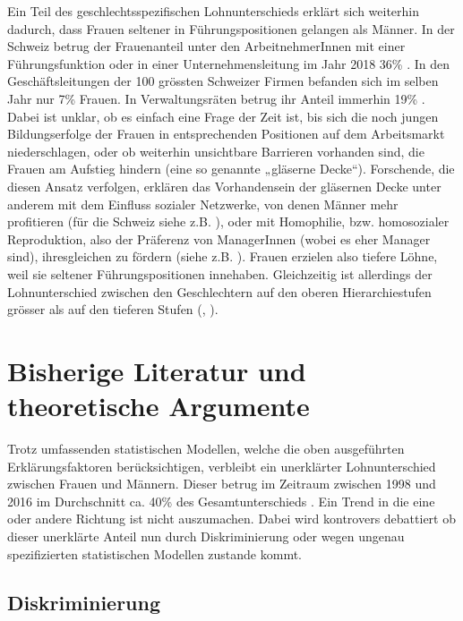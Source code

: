 \documentclass[a4paper,12pt]{article}
\renewcommand{\baselinestretch}{1.1}
\newif\ifcomments
\newcommand{\comment}[1]{%
    \ifcomments\marginpar{\renewcommand{\baselinestretch}{1}\tiny\hspace*{-1.1em}\colorbox{gray!20}%
    {\textcolor{red}{\parbox[t]{.9in}{\raggedright #1}}}}\fi}
\begin{document}
Ein Teil des geschlechtsspezifischen Lohnunterschieds erklärt sich weiterhin dadurch, dass Frauen
seltener in Führungspositionen gelangen als Männer. In der Schweiz betrug der
Frauenanteil unter den ArbeitnehmerInnen mit einer Führungsfunktion oder in
einer Unternehmensleitung im Jahr 2018 36\% \citep{BFS-2019c}. In den
Geschäftsleitungen der 100 grössten Schweizer Firmen befanden sich im selben
Jahr nur 7\% Frauen. In Verwaltungsräten betrug ihr Anteil immerhin 19\%
\citep{Schillingreport-2018}. Dabei ist unklar, ob es einfach eine Frage der
Zeit ist, bis sich die noch jungen Bildungserfolge der Frauen in entsprechenden
Positionen auf dem Arbeitsmarkt niederschlagen, oder ob weiterhin unsichtbare
Barrieren vorhanden sind, die Frauen am Aufstieg hindern (eine so genannte
„gläserne Decke“). Forschende, die diesen Ansatz verfolgen, erklären das
Vorhandensein der gläsernen Decke unter anderem mit dem Einfluss sozialer
Netzwerke, von denen Männer mehr profitieren (für die Schweiz siehe z.B.
\citealp{Rost-2010}), oder mit Homophilie, bzw. homosozialer Reproduktion, also
der Präferenz von ManagerInnen (wobei es eher Manager sind), ihresgleichen zu
fördern (siehe z.B. \citealp{Bihagen-Ohls-2006,Holst-Wiemer-2010,Ochsenfeld-2012}). Frauen erzielen
also tiefere Löhne, weil sie seltener Führungspositionen innehaben.
Gleichzeitig ist allerdings der Lohnunterschied zwischen den Geschlechtern auf
den oberen Hierarchiestufen grösser als auf den tieferen Stufen
(\citealp{Blau-Kahn-2016}, \citealp[42]{Strub-Bannwart-2017}).

\section{Bisherige Literatur und theoretische Argumente}
\label{sec:s2}

Trotz umfassenden statistischen Modellen, welche die oben ausgeführten Erklärungsfaktoren berücksichtigen, verbleibt ein unerklärter Lohnunterschied zwischen Frauen und Männern. Dieser betrug im Zeitraum zwischen 1998 und 2016 im Durchschnitt ca. 40\% des Gesamtunterschieds \citep{BFS-2019a,Strub-2010}. Ein Trend in die eine oder andere Richtung ist nicht auszumachen. Dabei wird kontrovers debattiert ob dieser unerklärte Anteil nun durch Diskriminierung oder wegen ungenau spezifizierten statistischen Modellen zustande kommt.

\subsection{Diskriminierung}
\comment{Abschnitt wurde neu überarbeitet}
\end{document}
